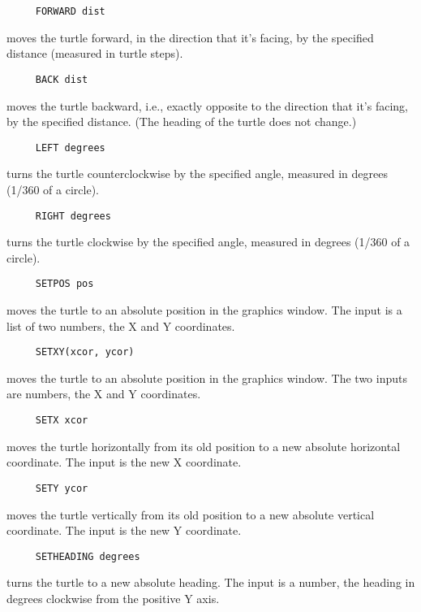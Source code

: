 \begin{verbatim}
     FORWARD dist
\end{verbatim}
moves the turtle forward, in the direction that it's facing, by the
specified distance (measured in turtle steps).

\begin{verbatim}
     BACK dist
\end{verbatim}
moves the turtle backward, i.e., exactly opposite to the direction
that it's facing, by the specified distance.  (The heading of the
turtle does not change.)

\begin{verbatim}
     LEFT degrees
\end{verbatim}
turns the turtle counterclockwise by the specified angle, measured in
degrees (1/360 of a circle).

\begin{verbatim}
     RIGHT degrees
\end{verbatim}
turns the turtle clockwise by the specified angle, measured in degrees
(1/360 of a circle).

\begin{verbatim}
     SETPOS pos
\end{verbatim}
\label{logoturtle:setpos}
moves the turtle to an absolute position in the graphics window.  The
input is a list of two numbers, the X and Y coordinates.

\begin{verbatim}
     SETXY(xcor, ycor)
\end{verbatim}
moves the turtle to an absolute position in the graphics window.  The
two inputs are numbers, the X and Y coordinates.

\begin{verbatim}
     SETX xcor
\end{verbatim}
moves the turtle horizontally from its old position to a new absolute
horizontal coordinate.  The input is the new X coordinate.

\begin{verbatim}
     SETY ycor
\end{verbatim}
moves the turtle vertically from its old position to a new absolute
vertical coordinate.  The input is the new Y coordinate.

\begin{verbatim}
     SETHEADING degrees
\end{verbatim}
\label{logoturtle:setheading}
turns the turtle to a new absolute heading.  The input is a number,
the heading in degrees clockwise from the positive Y axis.

